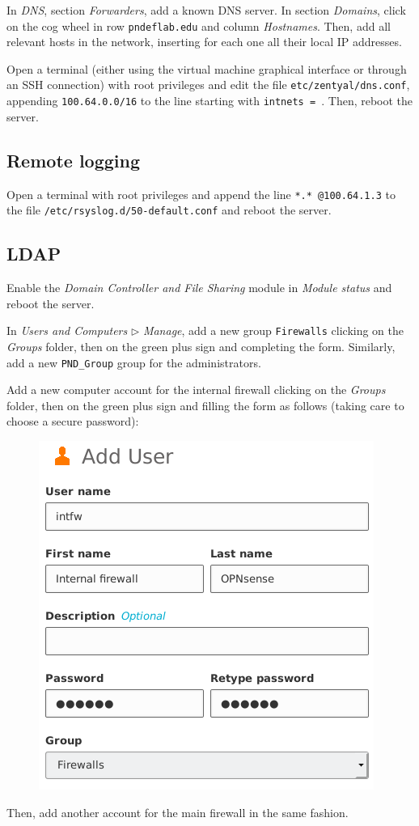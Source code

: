 \documentclass{homework}
\begin{document}
    In \textit{DNS}, section \textit{Forwarders}, add a known DNS server.
    In section \textit{Domains}, click on the cog wheel in row \texttt{pndeflab.edu} and column \textit{Hostnames}.
    Then, add all relevant hosts in the network, inserting for each one all their local IP addresses.
    
    Open a terminal (either using the virtual machine graphical interface or through an SSH connection) with root privileges and edit the file \texttt{etc/zentyal/dns.conf}, appending \texttt{100.64.0.0/16} to the line starting with \texttt{intnets = }. Then, reboot the server.
    
    \subsection{Remote logging}
    Open a terminal with root privileges and append the line \texttt{*.* @100.64.1.3} to the file \texttt{/etc/rsyslog.d/50-default.conf} and reboot the server.

    \subsection{LDAP}
    Enable the \textit{Domain Controller and File Sharing } module in \textit{Module status} and reboot the server.
    
    In \textit{Users and Computers} $\triangleright$ \textit{Manage}, add a new group \texttt{Firewalls} clicking on the \textit{Groups} folder, then on the green plus sign and completing the form.
    Similarly, add a new \texttt{PND\_Group} group for the administrators.
    
    Add a new computer account for the internal firewall clicking on the \textit{Groups} folder, then on the green plus sign and filling the form as follows (taking care to choose a secure password):
    \begin{figure}[H]
        \centering
        \includegraphics[width=0.7\linewidth]{images/intfw}
        \label{fig:group}
    \end{figure}
    \noindent Then, add another account for the main firewall in the same fashion.
    
\end{document}
